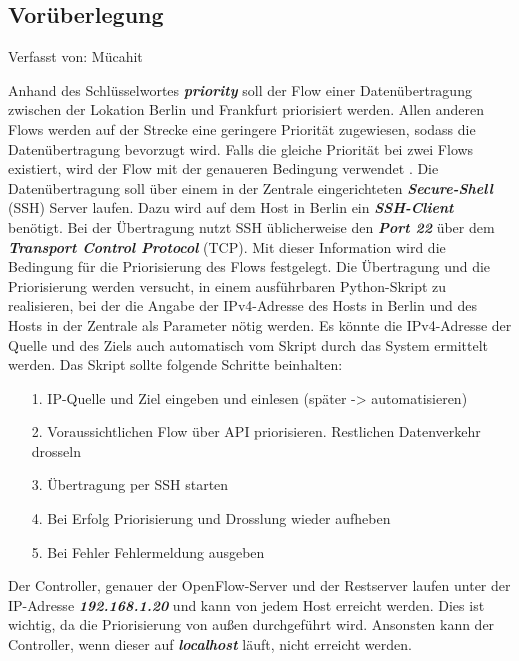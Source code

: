\documentclass[fontsize=12pt,paper=a4,open=any,parskip=half,
  twoside=false,toc=listof,toc=bibliography,fleqn,leqno,
  captions=nooneline,captions=tableabove,british]{scrbook}
\begin{document}
\subsection{Vorüberlegung}
{\tiny Verfasst von: Mücahit\par}
Anhand des Schlüsselwortes \textit{\textbf{priority}} soll der Flow einer Datenübertragung zwischen der Lokation Berlin und Frankfurt priorisiert werden. Allen anderen Flows werden auf der Strecke eine geringere Priorität zugewiesen, sodass die Datenübertragung bevorzugt wird. Falls die gleiche Priorität bei zwei Flows existiert, wird der Flow mit der genaueren Bedingung verwendet \cite{usingovs}. Die Datenübertragung soll über einem in der Zentrale eingerichteten \textit{\textbf{Secure-Shell}} (SSH) Server laufen. Dazu wird auf dem Host in Berlin ein \textit{\textbf{SSH-Client}} benötigt. Bei der Übertragung nutzt SSH üblicherweise den \textit{\textbf{Port 22}} über dem \textit{\textbf{Transport Control Protocol}} (TCP). Mit dieser Information wird die Bedingung für die Priorisierung des Flows festgelegt. Die Übertragung und die Priorisierung werden versucht, in einem ausführbaren Python-Skript zu realisieren, bei der die Angabe der IPv4-Adresse des Hosts in Berlin und des Hosts in der Zentrale als Parameter nötig werden. Es könnte die IPv4-Adresse der Quelle und des Ziels auch automatisch vom Skript durch das System ermittelt werden. Das Skript sollte folgende Schritte beinhalten:
\begin{itemize}
\item[1.] IP-Quelle und Ziel eingeben und einlesen (später -> automatisieren)
\item[2.] Voraussichtlichen Flow über API priorisieren. Restlichen Datenverkehr drosseln
\item[3.] Übertragung per SSH starten
\item[4.] Bei Erfolg Priorisierung und Drosslung wieder aufheben
\item[5.] Bei Fehler Fehlermeldung ausgeben
\end{itemize}
Der Controller, genauer der OpenFlow-Server und der Restserver laufen unter der IP-Adresse \textit{\textbf{192.168.1.20}} und kann von jedem Host erreicht werden. Dies ist wichtig, da die Priorisierung von außen durchgeführt wird. Ansonsten kann der Controller, wenn dieser auf \textit{\textbf{localhost}} läuft, nicht erreicht werden.

\newpage
\end{document}
